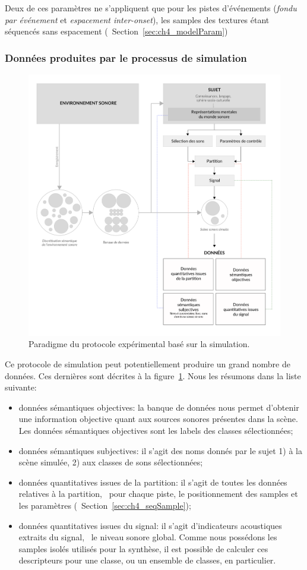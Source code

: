 Deux de ces paramètres ne s’appliquent que pour les pistes d'événements (\emph{fondu par événement} et \emph{espacement inter-onset}), les samples des textures étant séquencés sans espacement (\cf~Section~\ref{sec:ch4_modelParam})

\subsubsection{Données produites par le processus de simulation}

\begin{figure}[t]
        \myfloatalign
        \includegraphics[width=.8\linewidth]{gfx/ch_4/schemaXP}
       \caption{Paradigme du protocole expérimental basé sur la simulation.}\label{fig:paradigmeSimu2}
\end{figure}

Ce protocole de simulation peut potentiellement produire un grand nombre de données. Ces dernières sont décrites à la figure~\ref{fig:paradigmeSimu2}.  Nous les résumons dans la liste suivante:

\begin{itemize}
\item données sémantiques objectives: la banque de données nous permet d'obtenir une information objective quant aux sources sonores présentes dans la scène. Les données sémantiques objectives sont les labels des classes sélectionnées;
\item données sémantiques subjectives: il s'agit des noms donnés par le sujet 1) à la scène simulée, 2) aux classes de sons sélectionnées;
\item données quantitatives issues de la partition: il s'agit de toutes les données relatives à la partition, \ie~pour chaque piste, le positionnement des samples et les paramètres (\cf~Section~\ref{sec:ch4_seqSample});
\item données quantitatives issues du signal: il s'agit d'indicateurs acoustiques extraits du signal, \eg~le niveau sonore global. Comme nous possédons les samples isolés utilisés pour la synthèse, il est possible de calculer ces descripteurs pour une classe, ou un ensemble de classes, en particulier.
\end{itemize}

